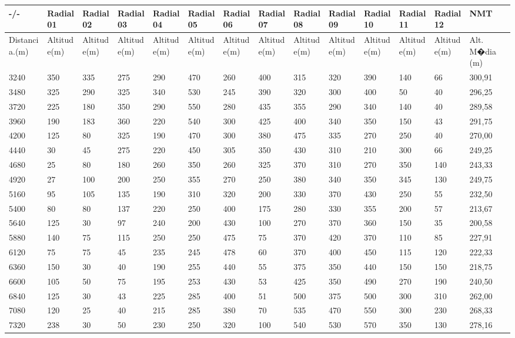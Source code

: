 \begin{table}
\begin{sideways}
\begin{tabular}{|l|l|l|l|l|l|l|l|l|l|l|l|l|l|}
-/- & Radial 01 & Radial 02 & Radial 03 & Radial 04 & Radial 05 & Radial 06 & Radial 07 & Radial 08 & Radial 09 & Radial 10 & Radial 11 & Radial 12 & NMT \\ \hline
Distancia.(m) & Altitude(m) & Altitude(m) & Altitude(m) & Altitude(m) & Altitude(m) & Altitude(m) & Altitude(m) & Altitude(m) & Altitude(m) & Altitude(m) & Altitude(m) & Altitude(m) & Alt. M�dia (m)\\\hline
3240 & 350 & 335 & 275 & 290 & 470 & 260 & 400 & 315 & 320 & 390 & 140 & 66 & 300,91\\
3480 & 325 & 290 & 325 & 340 & 530 & 245 & 390 & 320 & 300 & 400 & 50 & 40 & 296,25\\
3720 & 225 & 180 & 350 & 290 & 550 & 280 & 435 & 355 & 290 & 340 & 140 & 40 & 289,58\\
3960 & 190 & 183 & 360 & 220 & 540 & 300 & 425 & 400 & 340 & 350 & 150 & 43 & 291,75\\
4200 & 125 & 80 & 325 & 190 & 470 & 300 & 380 & 475 & 335 & 270 & 250 & 40 & 270,00\\
4440 & 30 & 45 & 275 & 220 & 450 & 305 & 350 & 430 & 310 & 210 & 300 & 66 & 249,25\\
4680 & 25 & 80 & 180 & 260 & 350 & 260 & 325 & 370 & 310 & 270 & 350 & 140 & 243,33\\
4920 & 27 & 100 & 200 & 250 & 355 & 270 & 250 & 380 & 340 & 350 & 345 & 130 & 249,75\\
5160 & 95 & 105 & 135 & 190 & 310 & 320 & 200 & 330 & 370 & 430 & 250 & 55 & 232,50\\
5400 & 80 & 80 & 137 & 220 & 250 & 400 & 175 & 280 & 330 & 355 & 200 & 57 & 213,67\\
5640 & 125 & 30 & 97 & 240 & 200 & 430 & 100 & 270 & 370 & 360 & 150 & 35 & 200,58\\
5880 & 140 & 75 & 115 & 250 & 250 & 475 & 75 & 370 & 420 & 370 & 110 & 85 & 227,91\\
6120 & 75 & 75 & 45 & 235 & 245 & 478 & 60 & 370 & 400 & 450 & 115 & 120 & 222,33\\
6360 & 150 & 30 & 40 & 190 & 255 & 440 & 55 & 375 & 350 & 440 & 150 & 150 & 218,75\\
6600 & 105 & 50 & 75 & 195 & 253 & 430 & 53 & 425 & 350 & 490 & 270 & 190 & 240,50\\
6840 & 125 & 30 & 43 & 225 & 285 & 400 & 51 & 500 & 375 & 500 & 300 & 310 & 262,00\\
7080 & 120 & 25 & 40 & 215 & 285 & 380 & 70 & 535 & 470 & 550 & 300 & 230 & 268,33\\
7320 & 238 & 30 & 50 & 230 & 250 & 320 & 100 & 540 & 530 & 570 & 350 & 130 & 278,16\\

\end{tabular}
\end{sideways}
\end{table}
